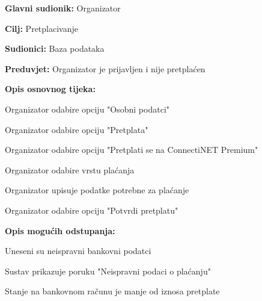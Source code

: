 					\noindent {}
					\begin{packed_item}
	
						\item \textbf{Glavni sudionik:} Organizator
						\item  \textbf{Cilj:} Pretplacivanje
						\item  \textbf{Sudionici:} Baza podataka
						\item  \textbf{Preduvjet:} Organizator je prijavljen i nije pretplaćen
						\item  \textbf{Opis osnovnog tijeka:}
						
						\item[] \begin{packed_enum}
	
							\item Organizator odabire opciju "Osobni podatci"
							\item Organizator odabire opciju "Pretplata"
							\item Organizator odabire opciju "Pretplati se na ConnectiNET Premium"
							\item Organizator odabire vrstu plaćanja
							\item Organizator upisuje podatke potrebne za plaćanje
							\item Organizator odabire opciju "Potvrdi pretplatu"

						\end{packed_enum}
						
						\item  \textbf{Opis mogućih odstupanja:}
						
						\item[] \begin{packed_item}
	
							\item[5.a] Uneseni su neispravni bankovni podatci
							\item[] \begin{packed_enum}
								
								\item Sustav prikazuje poruku "Neispravni podaci o plaćanju"
								
							\end{packed_enum}
							\item[6.a] Stanje na bankovnom računu je manje od iznosa pretplate
							
						\end{packed_item}
					\end{packed_item}

